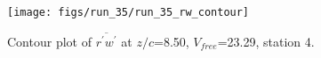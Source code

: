 \begin{figure}[H]
\centering
\texttt{[image: figs/run\_35/run\_35\_rw\_contour]}
\caption{Contour plot of $\overline{r^\prime w^\prime}$ at $z/c$=8.50, $V_{free}$=23.29, station 4.}
\label{fig:run_35_rw_contour}
\end{figure}


